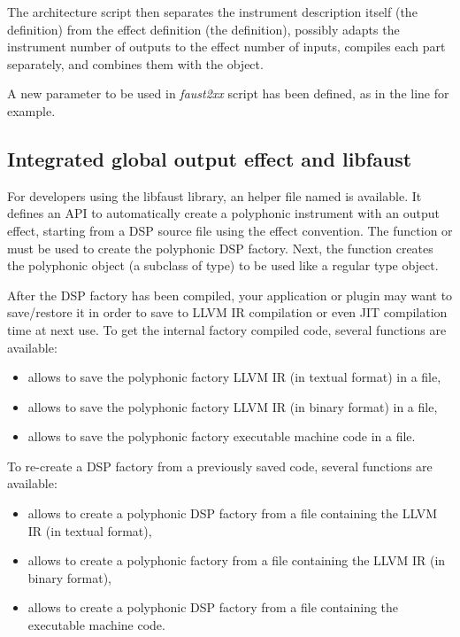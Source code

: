 The architecture script then separates the instrument description itself (the  definition) from the effect definition (the   definition), possibly adapts the instrument number of outputs to the effect number of inputs, compiles each part separately, and combines them with the  object.

A new  parameter to be used in {\it faust2xx} script has been defined, as in the  line for example.

\subsection{Integrated global output effect and libfaust}

For developers using the libfaust library, an helper file named  is available. It defines an API to automatically create a polyphonic instrument with an output effect, starting from a DSP source file using the  effect  convention. The function  or  \\  must be used to create the polyphonic DSP factory. Next, the  function creates the polyphonic object (a subclass of  type) to be used like a regular  type object. 

After the DSP factory has been compiled, your application or plugin may want to save/restore it in order to save \faust to LLVM IR compilation or even JIT compilation time at next use. To get the internal factory compiled code, several functions are available:

\begin{itemize}
\item {} allows to save the polyphonic factory LLVM IR (in textual format) in a file,
\item {} allows to save the polyphonic factory LLVM IR (in binary format) in a file,
\item {} allows to save the polyphonic factory executable machine code in a file.
\end{itemize}

To re-create a DSP factory from a previously saved code, several functions are available:

\begin{itemize}
\item {} allows to create a polyphonic DSP factory from a file containing the LLVM IR (in textual format),
\item {} allows to create a polyphonic  factory from a file containing the LLVM IR (in binary format),
\item {} allows to create a polyphonic DSP factory from a file containing the executable machine code.
\end{itemize}
